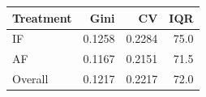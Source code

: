 \begin{tabular}{lrrr}
  \toprule
  Treatment & Gini & CV & IQR \\ 
  \midrule
  IF & 0.1258 & 0.2284 & 75.0 \\ 
  AF & 0.1167 & 0.2151 & 71.5 \\ 
  Overall & 0.1217 & 0.2217 & 72.0 \\ 
  \bottomrule
\end{tabular}
